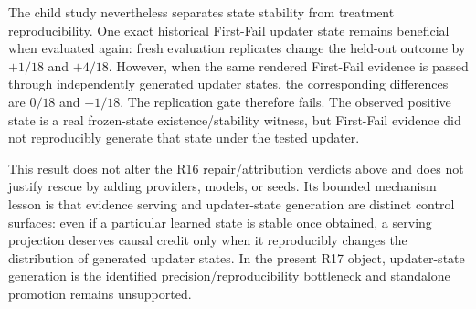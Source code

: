 The child study nevertheless separates state stability from treatment reproducibility. One exact historical First-Fail updater state remains beneficial when evaluated again: fresh evaluation replicates change the held-out outcome by $+1/18$ and $+4/18$. However, when the same rendered First-Fail evidence is passed through independently generated updater states, the corresponding differences are $0/18$ and $-1/18$. The replication gate therefore fails. The observed positive state is a real frozen-state existence/stability witness, but First-Fail evidence did not reproducibly generate that state under the tested updater.

This result does not alter the R16 repair/attribution verdicts above and does not justify rescue by adding providers, models, or seeds. Its bounded mechanism lesson is that evidence serving and updater-state generation are distinct control surfaces: even if a particular learned state is stable once obtained, a serving projection deserves causal credit only when it reproducibly changes the distribution of generated updater states. In the present R17 object, updater-state generation is the identified precision/reproducibility bottleneck and standalone promotion remains unsupported.
